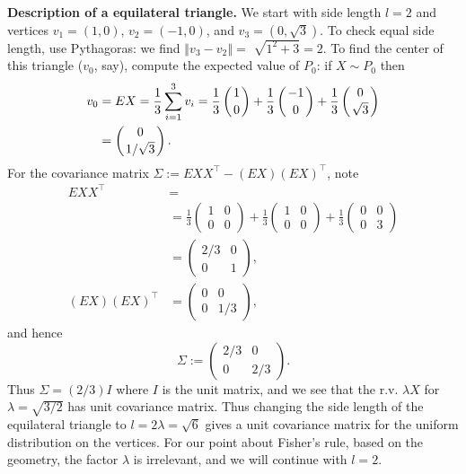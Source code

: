 \documentclass[11pt,twoside]{article}%
\theoremstyle{change}
\begin{document}
\textbf{Description of a equilateral triangle.} We start with side length
$l=2$ and vertices $v_{1}=\left(  1,0\right)  $, $v_{2}=\left(  -1,0\right)
$, and $v_{3}=\left(  0,\sqrt{3}\right)  $. To check equal side length, use
Pythagoras: we find $\left\Vert v_{3}-v_{2}\right\Vert =$ $\sqrt{1^{2}+3}=2$.
To find the center of this triangle ($v_{0}$, say), compute the expected value
of $P_{0}$: if $X\sim P_{0}$ then
\begin{align*}
v_{0}  & =EX=\frac{1}{3}\sum_{i=1}^{3}v_{i}=\frac{1}{3}\left(
\genfrac{}{}{0pt}{}{1}{0}%
\right)  +\frac{1}{3}\left(
\genfrac{}{}{0pt}{}{-1}{0}%
\right)  +\frac{1}{3}\left(
\genfrac{}{}{0pt}{}{0}{\sqrt{3}}%
\right) \\
& =\left(
\genfrac{}{}{0pt}{}{0}{1/\sqrt{3}}%
\right)  .
\end{align*}
For the covariance matrix $\Sigma:=EXX^{\top}-\left(  EX\right)  \left(
EX\right)  ^{\top}$, note
\begin{align*}
EXX^{\top}  & =\\
& =\frac{1}{3}%
\begin{pmatrix}
1 & 0\\
0 & 0
\end{pmatrix}
+\frac{1}{3}%
\begin{pmatrix}
1 & 0\\
0 & 0
\end{pmatrix}
+\frac{1}{3}%
\begin{pmatrix}
0 & 0\\
0 & 3
\end{pmatrix}
\\
& =%
\begin{pmatrix}
2/3 & 0\\
0 & 1
\end{pmatrix}
,\\
\left(  EX\right)  \left(  EX\right)  ^{\top}  & =%
\begin{pmatrix}
0 & 0\\
0 & 1/3
\end{pmatrix}
,
\end{align*}
and hence%
\[
\Sigma:=%
\begin{pmatrix}
2/3 & 0\\
0 & 2/3
\end{pmatrix}
.
\]
Thus $\Sigma=(2/3)I$ where $I$ is the unit matrix, and we see that the r.v.
$\lambda X$ for $\lambda=\sqrt{3/2}$ has unit covariance matrix. Thus changing
the side length of the equilateral triangle to $l=2\lambda=\sqrt{6} $ gives a
unit covariance matrix for the uniform distribution on the vertices. For our
point about Fisher's rule, based on the geometry, the factor $\lambda$ is
irrelevant, and we will continue with $l=2$.
\end{document}
